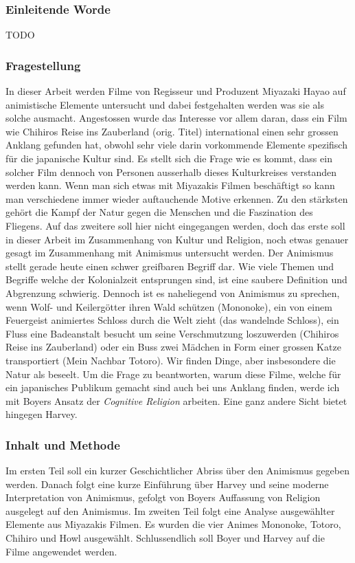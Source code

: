\subsubsection*{Einleitende Worde}
TODO
\subsubsection*{Fragestellung}
In dieser Arbeit werden Filme von Regisseur und Produzent Miyazaki Hayao auf animistische Elemente untersucht und dabei festgehalten werden was sie als solche ausmacht.
Angestossen wurde das Interesse vor allem daran, dass ein Film wie Chihiros Reise ins Zauberland (orig. Titel) international einen sehr grossen Anklang gefunden hat, obwohl sehr viele darin vorkommende Elemente spezifisch für die japanische Kultur sind. Es stellt sich die Frage wie es kommt, dass ein solcher Film dennoch von Personen ausserhalb dieses Kulturkreises verstanden werden kann. Wenn man sich etwas mit Miyazakis Filmen beschäftigt so kann man verschiedene immer wieder auftauchende Motive erkennen. Zu den stärksten gehört die Kampf der Natur gegen die Menschen und die Faszination des Fliegens. Auf das zweitere soll hier nicht eingegangen werden, doch das erste soll in dieser Arbeit im Zusammenhang von Kultur und Religion, noch etwas genauer gesagt im Zusammenhang mit Animismus untersucht werden. Der Animismus stellt gerade heute einen schwer greifbaren Begriff dar. Wie viele Themen und Begriffe welche der Kolonialzeit entsprungen sind, ist eine saubere Definition und Abgrenzung schwierig. Dennoch ist es naheliegend von Animismus zu sprechen, wenn Wolf- und Keilergötter ihren Wald schützen (Mononoke), ein von einem Feuergeist animiertes Schloss durch die Welt zieht (das wandelnde Schloss), ein Fluss eine Badeanstalt besucht um seine Verschmutzung loszuwerden (Chihiros Reise ins Zauberland) oder ein Buss zwei Mädchen in Form einer grossen Katze transportiert (Mein Nachbar Totoro). Wir finden Dinge, aber insbesondere die Natur als beseelt. Um die Frage zu beantworten, warum diese Filme, welche für ein japanisches Publikum gemacht sind auch bei uns Anklang finden, werde ich mit Boyers Ansatz der \emph{Cognitive Religion} arbeiten. Eine ganz andere Sicht bietet hingegen Harvey.
\subsubsection*{Inhalt und Methode}
Im ersten Teil soll ein kurzer Geschichtlicher Abriss über den Animismus gegeben werden. Danach folgt eine kurze Einführung über Harvey und seine moderne Interpretation von Animismus, gefolgt von Boyers Auffassung von Religion ausgelegt auf den Animismus. Im zweiten Teil folgt eine Analyse ausgewählter Elemente aus Miyazakis Filmen. Es wurden die vier Animes Mononoke, Totoro, Chihiro und Howl ausgewählt. Schlussendlich soll Boyer und Harvey auf die Filme angewendet werden.
